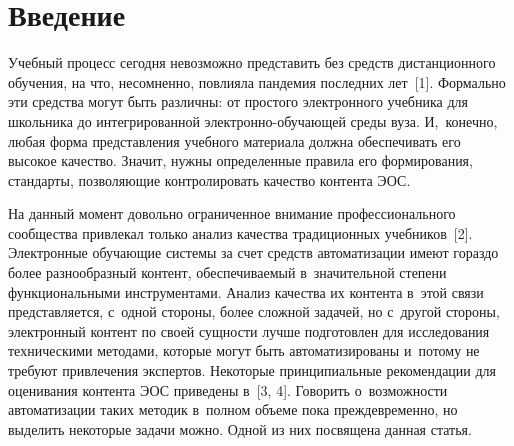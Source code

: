 
  
\vspace*{-6pt}



\thispagestyle{headings}

\begin{multicols}{2}

\label{st\stat}

\section{Введение}

     Учебный процесс сегодня невозможно пред\-ста\-вить без средств 
дистанционного обучения, на что, несомненно, повлияла пандемия 
по\-след\-них лет~[1]. Формально эти средства могут быть различны: от 
прос\-то\-го электронного учебника для школьника до интегрированной  
элект\-рон\-но-обуча\-ющей среды вуза. И,~конечно, любая форма 
пред\-став\-ле\-ния учебного материала должна обеспечивать его высокое 
качество. Значит, нужны определенные правила его формирования, 
стандарты, поз\-во\-ля\-ющие контролировать качество контента ЭОС.
     
     На данный момент довольно ограниченное внимание 
профессионального сообщества привлекал только анализ качества 
традиционных учебников~[2]. Электронные обуча\-ющие сис\-те\-мы за счет средств автоматизации имеют 
гораздо более разнообразный контент, обес\-пе\-чи\-ва\-емый в~значительной 
степени функциональными инструментами. Анализ качества их контента 
в~этой связи пред\-став\-ля\-ет\-ся, с~одной стороны, более слож\-ной задачей, но 
с~другой стороны, электронный контент по своей сущ\-ности лучше 
подготовлен для исследования техническими методами, которые могут быть 
автоматизированы и~потому не требуют привлечения экспертов. Некоторые 
принципиальные рекомендации для оценивания контента ЭОС приведены 
в~[3, 4]. Говорить о~воз\-мож\-ности автоматизации таких методик в~пол\-ном 
объ\-еме пока преждевременно, но выделить некоторые задачи мож\-но. Одной 
из них по\-свя\-ще\-на данная \mbox{статья}.
     

\end{multicols}

